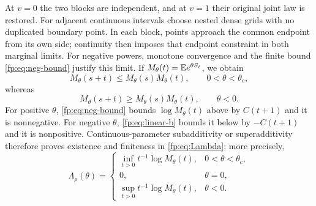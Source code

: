 At $v=0$ the two blocks are independent, and at $v=1$ their original
joint law is restored. For adjacent continuous intervals choose nested
dense grids with no duplicated boundary point. In each block, points
approach the common endpoint from its own side; continuity then imposes
that endpoint constraint in both marginal limits. For negative powers,
monotone convergence and the finite bound \eqref{fp:eq:neg-bound}
justify this limit. If $M_\theta(t)=\mathbb E e^{\theta S_t}$, we obtain
\begin{equation}\label{fp:eq:theta-subadd}
 M_\theta(s+t)\le M_\theta(s)M_\theta(t),
 \qquad0<\theta<\theta_c,
\end{equation}
whereas
\begin{equation}\label{fp:eq:theta-superadd}
 M_\theta(s+t)\ge M_\theta(s)M_\theta(t),
 \qquad\theta<0.
\end{equation}
For positive $\theta$, \eqref{fp:eq:neg-bound} bounds $\log M_\theta(t)$ above by $C(t+1)$ and it is nonnegative. For negative $\theta$, \eqref{fp:eq:linear-b} bounds it below by $-C(t+1)$ and it is nonpositive. Continuous-parameter subadditivity or superadditivity therefore proves existence and finiteness in \eqref{fp:eq:Lambda}; more precisely,
\begin{equation}\label{fp:eq:Lambda-inf-sup}
 \Lambda_\rho(\theta)=
 \begin{cases}
 \inf_{t>0}t^{-1}\log M_\theta(t),&0<\theta<\theta_c,\\
 0,&\theta=0,\\
 \sup_{t>0}t^{-1}\log M_\theta(t),&\theta<0.
 \end{cases}
\end{equation}

